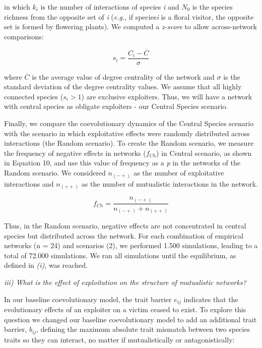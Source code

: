\documentclass[a4paper, 12pt]{article}
\begin{document}
in which $k_{i}$ is the number of interactions of species \textit{i} and $N_{0}$ is the species richness from the opposite set of \textit{i} (\textit{e.g.}, if species\textit{i} is a floral visitor, the opposite set is formed by flowering plants). We computed a \textit{z-score} to allow across-network comparisons: 

\begin{equation} \label{eq:9}
  s_{i} = \frac{C_{i} - \overline{C}}{\sigma}
\end{equation}

where $\overline{C}$ is the average value of degree centrality of the network and $\sigma$ is the standard deviation of the degree centrality values. We assume that all highly connected species ($s_{i} > 1$) are exclusive exploiters. Thus, we will have a network with central species as obligate exploiters - our Central Species scenario. 

Finally, we compare the coevolutionary dynamics of the Central Species scenario with the scenario in which exploitative effects were randomly distributed across interactions (the Random scenario). To create the Random scenario, we measure the frequency of negative effects in networks ($f_{Ch}$) in Central scenario, as shown in Equation 10, and use this value of frequency as a \textit{p} in the networks of the Random scenario. We considered $n_{(- +)}$ as the number of exploitative interactions and $n_{(+ +)}$ as the number of mutualistic interactions in the network.

\begin{equation} \label{eq:10}
  f_{Ch} = \frac{n_{(-+)}}{n_{(-+)} + n_{(++)}}
\end{equation}

Thus, in the Random scenario, negative effects are not concentrated in central species but distributed across the network. For each combination of empirical networks (n = 24) and scenarios (2), we performed 1.500 simulations, leading to a total of  72.000 simulations. We ran all simulations until the equilibrium, as defined in \textit{(i)}, was reached.

\textit{iii) What is the effect of exploitation on the structure of mutualistic networks?}

In our baseline coevolutionary model, the trait barrier $e_{ij}$ indicates that the evolutionary effects of an exploiter on a victim ceased to exist. To explore this question we changed our baseline coevolutionary model to add an additional trait barrier, $b_{ij}$, defining the maximum absolute trait mismatch between two species traits so they can interact, no matter if mutualistically or antagonistically:
\end{document}
